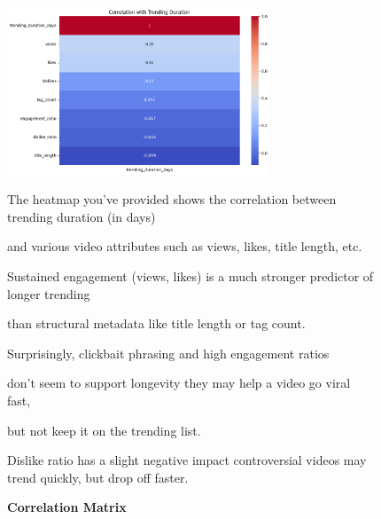 \documentclass[a4paper]{article}
\begin{document}
\begin{figure}[h]
    \centering
    \includegraphics[width=0.7\textwidth]{correlation.png}
    \caption{\textbf{Correlation Matrix}}
    
   The heatmap you've provided shows the correlation between trending duration (in days) \
   
   and various video attributes such as views, likes, title length, etc.

Sustained engagement (views, likes) is a much stronger predictor of longer trending\

 than structural metadata like title length or tag count.

Surprisingly, clickbait phrasing and high engagement ratios \

don’t seem to support longevity they may help a video go viral fast,\

 but not keep it on the trending list.

Dislike ratio has a slight negative impact controversial videos may trend quickly, but drop off faster.

    
    \label{fig:sales}
\end{figure}
\end{document}
